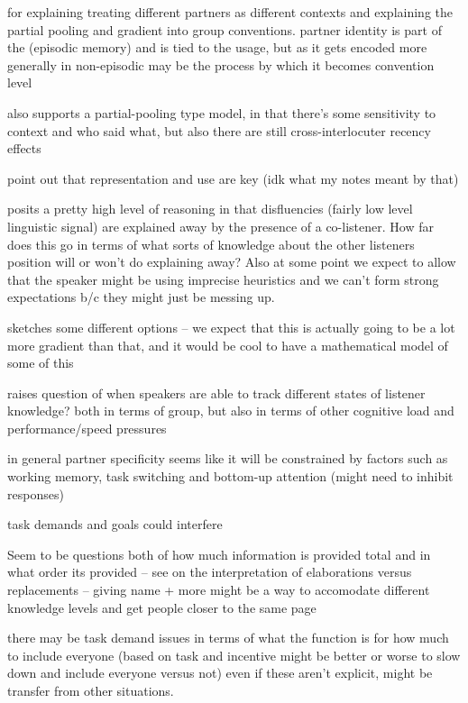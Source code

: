 \documentclass[]{article}
\begin{document}
\cite{hawkins2021} for explaining treating different partners as different contexts and explaining the partial pooling and gradient into group conventions. partner identity is part of the (episodic memory) and is tied to the usage, but as it gets encoded more generally in non-episodic may be the process by which it becomes convention level 

\cite{yoon2014} also supports a partial-pooling type model, in that there's some sensitivity to context and who said what, but also there are still cross-interlocuter recency effects

\cite{yoon2014} point out that representation and use are key (idk what my notes meant by that) 

\cite{yoon2014} posits a pretty high level of reasoning in that disfluencies (fairly low level linguistic signal) are explained away by the presence of a co-listener. How far does this go in terms of what sorts of knowledge about the other listeners position will or won't do explaining away? Also at some point we expect to allow that the speaker might be using imprecise heuristics and we can't form strong expectations b/c they might just be messing up. 

\cite{yoon2018} sketches some different options -- we expect that this is actually going to be a lot more gradient than that, and it would be cool to have a mathematical model of some of this

\cite{yoon2018} raises question of when speakers are able to track different states of listener knowledge? both in terms of group, but also in terms of other cognitive load and performance/speed pressures 

in general partner specificity seems like it will be constrained by factors such as working memory, task switching and bottom-up attention (might need to inhibit responses) 

task demands and goals could interfere

Seem to be questions both of how much information is provided total and in what order its provided -- see \cite{yoon2018} on the interpretation of elaborations versus replacements -- giving name + more might be a way to accomodate different knowledge levels and get people closer to the same page 

\cite{yoon2019} there may be task demand issues in terms of what the function is for how much to include everyone (based on task and incentive might be better or worse to slow down and include everyone versus not) even if these aren't explicit, might be transfer from other situations. 
\end{document}
